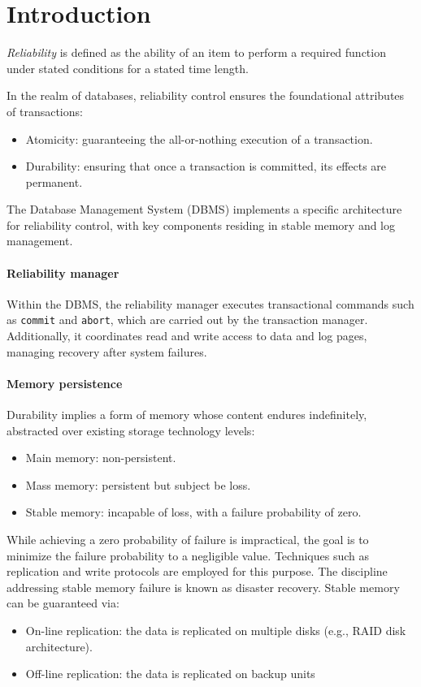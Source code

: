 \section{Introduction}

\begin{definition}
    \emph{Reliability} is defined as the ability of an item to perform a required function under stated conditions for a stated time length.
\end{definition}
In the realm of databases, reliability control ensures the foundational attributes of transactions:
\begin{itemize}
    \item Atomicity: guaranteeing the all-or-nothing execution of a transaction.
    \item Durability: ensuring that once a transaction is committed, its effects are permanent.
\end{itemize}
The Database Management System (DBMS) implements a specific architecture for reliability control, with key components residing in stable memory and log management.

\paragraph*{Reliability manager}
Within the DBMS, the reliability manager executes transactional commands such as \texttt{commit} and \texttt{abort}, which are carried out by the transaction manager. 
Additionally, it coordinates read and write access to data and log pages, managing recovery after system failures.

\paragraph*{Memory persistence}
Durability implies a form of memory whose content endures indefinitely, abstracted over existing storage technology levels:
\begin{itemize}
    \item Main memory: non-persistent.
    \item Mass memory: persistent but subject be loss.
    \item Stable memory: incapable of loss, with a failure probability of zero.
\end{itemize}
While achieving a zero probability of failure is impractical, the goal is to minimize the failure probability to a negligible value. 
Techniques such as replication and write protocols are employed for this purpose. 
The discipline addressing stable memory failure is known as disaster recovery.
Stable memory can be guaranteed via:
\begin{itemize}
    \item On-line replication: the data is replicated on multiple disks (e.g., RAID disk architecture).
    \item Off-line replication: the data is replicated on backup units
\end{itemize}

